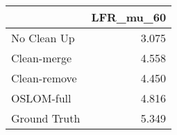 \begin{tabular}{lr}
\toprule
{} & LFR_mu_60 \\
\midrule
No Clean Up  &     3.075 \\
Clean-merge  &     4.558 \\
Clean-remove &     4.450 \\
OSLOM-full   &     4.816 \\
Ground Truth &     5.349 \\
\bottomrule
\end{tabular}
